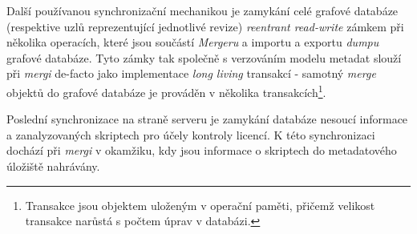 Další používanou synchronizační mechanikou je zamykání celé grafové databáze (respektive uzlů reprezentující jednotlivé revize) \textit{reentrant read-write} zámkem při několika operacích, které jsou součástí \textit{Mergeru} a importu a exportu \textit{dumpu} grafové databáze. Tyto zámky tak společně s verzováním modelu metadat slouží při \textit{mergi} de-facto jako implementace \textit{long living} transakcí - samotný \textit{merge} objektů do grafové databáze je prováděn v několika transakcích\footnote{Transakce jsou objektem uloženým v operační paměti, přičemž velikost transakce narůstá s počtem úprav v databázi.}.

Poslední synchronizace na straně serveru je zamykání databáze nesoucí informace a zanalyzovaných skriptech pro účely kontroly licencí. K této synchronizaci dochází při \textit{mergi} v okamžiku, kdy jsou informace o skriptech do metadatového úložiště nahrávány.


